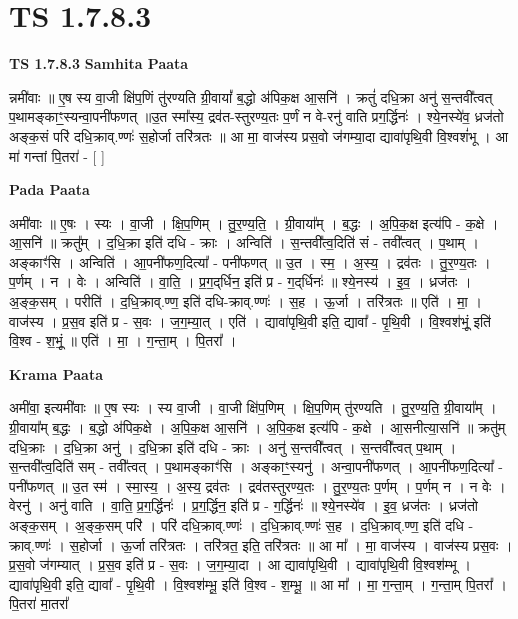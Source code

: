 \documentclass[17pt]{extarticle}
\begin{document}
\section{ TS 1.7.8.3 }

\textbf{TS 1.7.8.3 } \newline
\textbf{Samhita Paata} \newline

न्नमी॑वाः ॥ ए॒ष स्य वा॒जी क्षि॑प॒णिं तु॑रण्यति ग्री॒वायां᳚ ब॒द्धो अ॑पिक॒क्ष आ॒सनि॑ । क्रतुं॑ दधि॒क्रा अनु॑ स॒न्तवी᳚त्वत् प॒थामङ्काꣳ॒॒स्यन्वा॒पनी॑फणत् ॥उ॒त स्मा᳚स्य॒ द्रव॑त-स्तुरण्य॒तः प॒र्णं न वे-रनु॑ वाति प्रग॒र्द्धिनः॑ । श्ये॒नस्ये॑व॒ ध्रज॑तो अङ्क॒सं परि॑ दधि॒क्राव्.ण्णः॑ स॒होर्जा तरि॑त्रतः ॥ आ मा॒ वाज॑स्य प्रस॒वो ज॑गम्या॒दा द्यावा॑पृथि॒वी वि॒श्वशं॑भू । आ मा॑ गन्तां पि॒तरा॑ - [ ] \newline

\textbf{Pada Paata} \newline

अमी॑वाः ॥ ए॒षः । स्यः । वा॒जी । क्षि॒प॒णिम् । तु॒र॒ण्य॒ति॒ । ग्री॒वाया᳚म् । ब॒द्धः । अ॒पि॒क॒क्ष इत्य॑पि - क॒क्षे । आ॒सनि॑ ॥ क्रतु᳚म् । द॒धि॒क्रा इति॑ दधि - क्राः । अन्विति॑ । स॒न्तवी᳚त्व॒दिति॑ सं - तवी᳚त्वत् । प॒थाम् । अङ्काꣳ॑सि । अन्विति॑ । आ॒पनी॑फण॒दित्या᳚ - पनी॑फणत् ॥ उ॒त । स्म॒ । अ॒स्य॒ । द्रव॑तः । तु॒र॒ण्य॒तः । प॒र्णम् । न । वेः । अन्विति॑ । वा॒ति॒ । प्र॒ग॒द्‌र्धिन॒ इति॑ प्र - ग॒द्‌र्धिनः॑ ॥ श्ये॒नस्य॑ । इ॒व॒ । ध्रज॑तः । अ॒ङ्क॒सम् । परीति॑ । द॒धि॒क्राव्.ण्ण॒ इति॑ दधि-क्राव्.ण्णः॑ । स॒ह । ऊ॒र्जा । तरि॑त्रतः ॥ एति॑ । मा॒ । वाज॑स्य । प्र॒स॒व इति॑ प्र - स॒वः । ज॒ग॒म्या॒त् । एति॑ । द्यावा॑पृथि॒वी इति॒ द्यावा᳚ - पृ॒थि॒वी । वि॒श्वश॑भूं॒ इति॑ वि॒श्व - श॒भूं॒ ॥ एति॑ । मा॒ । ग॒न्ता॒म् । पि॒तरा᳚ ।  \newline


\textbf{Krama Paata} \newline

अमी॑वा॒ इत्यमी॑वाः ॥ ए॒ष स्यः । स्य वा॒जी । वा॒जी क्षि॑प॒णिम् । क्षि॒प॒णिम् तु॑रण्यति । तु॒र॒ण्य॒ति॒ ग्री॒वाया᳚म् । ग्री॒वाया᳚म् ब॒द्धः । ब॒द्धो अ॑पिक॒क्षे । अ॒पि॒क॒क्ष आ॒सनि॑ । अ॒पि॒क॒क्ष इत्य॑पि - क॒क्षे । आ॒सनीत्या॒सनि॑ ॥ क्रतु॑म् दधि॒क्राः । द॒धि॒क्रा अनु॑ । द॒धि॒क्रा इति॑ दधि - क्राः । अनु॑ स॒न्तवी᳚त्वत् । स॒न्तवी᳚त्वत् प॒थाम् । स॒न्तवी᳚त्व॒दिति॑ सम् - तवी᳚त्वत् । प॒थामङ्काꣳ॑सि । अङ्काꣳ॒॒स्यनु॑ । अन्वा॒पनी॑फणत् । आ॒पनी॑फण॒दित्या᳚ - पनी॑फणत् ॥ उ॒त स्म॑ । स्मा॒स्य॒ । अ॒स्य॒ द्रव॑तः । द्रव॑तस्तुरण्य॒तः । तु॒र॒ण्य॒तः प॒र्णम् । प॒र्णम् न । न वेः । वेरनु॑ । अनु॑ वाति । वा॒ति॒ प्र॒ग॒र्द्धिनः॑ । प्र॒ग॒र्द्धिन॒ इति॑ प्र - ग॒र्द्धिनः॑ ॥ श्ये॒नस्ये॑व । इ॒व॒ ध्रज॑तः । ध्रज॑तो अङ्क॒सम् । अ॒ङ्क॒सम् परि॑ । परि॑ दधि॒क्राव्.ण्णः॑ । द॒धि॒क्राव्.ण्णः॑ स॒ह । द॒धि॒क्राव्.ण्ण॒ इति॑ दधि - क्राव्.ण्णः॑ । स॒होर्जा । ऊ॒र्जा तरि॑त्रतः । तरि॑त्रत॒ इति॒ तरि॑त्रतः ॥ आ मा᳚ । मा॒ वाज॑स्य । वाज॑स्य प्रस॒वः । प्र॒स॒वो ज॑गम्यात् । प्र॒स॒व इति॑ प्र - स॒वः । ज॒ग॒म्या॒दा । आ द्यावा॑पृथि॒वी । द्यावा॑पृथि॒वी वि॒श्वश॑म्भू । द्यावा॑पृथि॒वी इति॒ द्यावा᳚ - पृ॒थि॒वी । वि॒श्वश॑म्भू॒ इति॑ वि॒श्व - श॒म्भू॒ ॥ आ मा᳚ । मा॒ ग॒न्ता॒म् । ग॒न्ता॒म् पि॒तरा᳚ । पि॒तरा॑ मा॒तरा᳚ \newline
\end{document}
